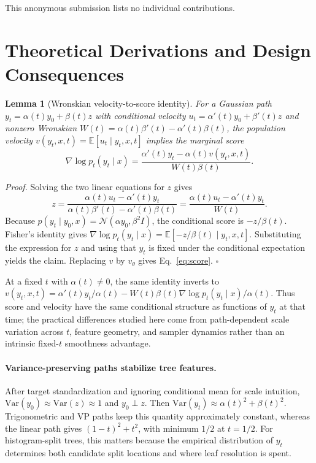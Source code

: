 \documentclass{uai2026}
\newcommand{\E}{\mathbb{E}}
\newcommand{\Var}{\mathrm{Var}}
\newcommand{\Norm}{\mathcal{N}}
\newtheorem{lemma}{Lemma}
\begin{document}
\begin{contributions}
This anonymous submission lists no individual contributions.
\end{contributions}



\appendix
\onecolumn

\section{Theoretical Derivations and Design Consequences}\label{app:theory}

\begin{lemma}[Wronskian velocity-to-score identity]\label{lem:wronskian-score}
For a Gaussian path $y_t=\alpha(t)y_0+\beta(t)z$ with conditional velocity $u_t=\alpha'(t)y_0+\beta'(t)z$ and nonzero Wronskian $W(t)=\alpha(t)\beta'(t)-\alpha'(t)\beta(t)$, the population velocity $v(y_t,x,t)=\E[u_t\mid y_t,x,t]$ implies the marginal score
\[
\nabla \log p_t(y_t\mid x)=\frac{\alpha'(t)y_t-\alpha(t)v(y_t,x,t)}{W(t)\beta(t)}.
\]
\end{lemma}
\emph{Proof.} Solving the two linear equations for $z$ gives
\[
z=\frac{\alpha(t)u_t-\alpha'(t)y_t}{\alpha(t)\beta'(t)-\alpha'(t)\beta(t)}
  =\frac{\alpha(t)u_t-\alpha'(t)y_t}{W(t)}.
\]
Because $p(y_t\mid y_0,x)=\Norm(\alpha y_0,\beta^2 I)$, the conditional score is $-z/\beta(t)$. Fisher's identity gives $\nabla\log p_t(y_t\mid x)=\E[-z/\beta(t)\mid y_t,x,t]$. Substituting the expression for $z$ and using that $y_t$ is fixed under the conditional expectation yields the claim. Replacing $v$ by $v_\theta$ gives Eq.~\eqref{eq:score}. \hfill$\square$

At a fixed $t$ with $\alpha(t)\neq0$, the same identity inverts to $v(y_t,x,t)=\alpha'(t)y_t/\alpha(t)-W(t)\beta(t)\nabla\log p_t(y_t\mid x)/\alpha(t)$. Thus score and velocity have the same conditional structure as functions of $y_t$ at that time; the practical differences studied here come from path-dependent scale variation across $t$, feature geometry, and sampler dynamics rather than an intrinsic fixed-$t$ smoothness advantage.

\paragraph{Variance-preserving paths stabilize tree features.} After target standardization and ignoring conditional mean for scale intuition, $\Var(y_0)\approx\Var(z)\approx 1$ and $y_0\perp z$. Then $\Var(y_t)\approx\alpha(t)^2+\beta(t)^2$. Trigonometric and VP paths keep this quantity approximately constant, whereas the linear path gives $(1-t)^2+t^2$, with minimum $1/2$ at $t=1/2$. For histogram-split trees, this matters because the empirical distribution of $y_t$ determines both candidate split locations and where leaf resolution is spent.
\end{document}
